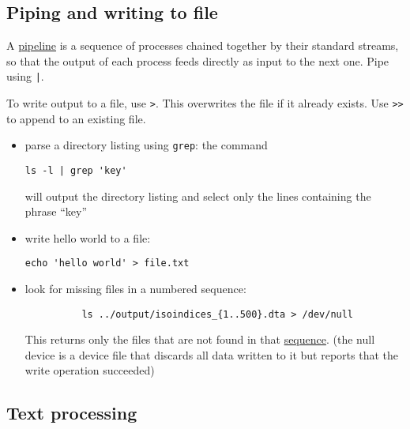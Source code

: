 \subsection{Piping and writing to file}
A \href{https://en.wikipedia.org/wiki/Pipeline_(Unix)}{pipeline} is a sequence of processes chained together by their standard streams, so that the output of each process feeds directly as input to the next one.
Pipe using \texttt{|}.

To write output to a file, use \texttt{>}.
This overwrites the file if it already exists.
Use \texttt{>>} to append to an existing file.


\begin{itemize}
	\item parse a directory listing using \texttt{grep}: the command
	\begin{verbatim}ls -l | grep 'key'\end{verbatim}
	will output the directory listing and select only the lines containing the phrase ``key''
	\item write hello world to a file:
	\begin{verbatim}echo 'hello world' > file.txt\end{verbatim}
	\item look for missing files in a numbered sequence:
		  \begin{verbatim}
		  ls ../output/isoindices_{1..500}.dta > /dev/null
		  \end{verbatim}
		  This returns only the files that are not found in that \href{http://www.thelinuxrain.com/articles/building-sequences-of-numbers-on-the-command-line}{sequence}.
		  (the null device is a device file that discards all data written to it but reports that the write operation succeeded)
\end{itemize}

\subsection{Text processing}

